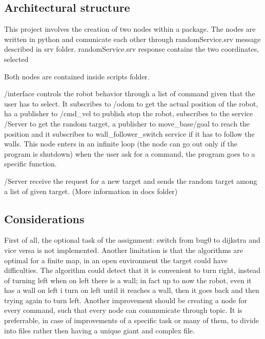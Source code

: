 \subsection*{Architectural structure}

This project involves the creation of two nodes within a package. The nodes are written in python and comunicate each other through \textquotesingle{}random\+Service.\+srv\textquotesingle{} message described in srv folder. \textquotesingle{}random\+Service.\+srv\textquotesingle{} response contains the two coordinates, selected

Both nodes are contained inside scripts folder.
\begin{DoxyItemize}
\item \textquotesingle{}/interface\textquotesingle{} controls the robot behavior through a list of command given that the user has to select. It subscribes to \textquotesingle{}/odom\textquotesingle{} to get the actual position of the robot, ha a publisher to \textquotesingle{}/cmd\+\_\+vel\textquotesingle{} to publish stop the robot, subscribes to the service \textquotesingle{}/\+Server\textquotesingle{} to get the random target, a publisher to \textquotesingle{}move\+\_\+base/goal\textquotesingle{} to reach the position and it subscribes to \textquotesingle{}wall\+\_\+follower\+\_\+switch\textquotesingle{} service if it has to follow the walls. This node enters in an infinite loop (the node can go out only if the program is shutdown) when the user ask for a command, the program goes to a specific function.
\item \textquotesingle{}/\+Server\textquotesingle{} receive the request for a new target and sends the random target among a list of given target. (More information in docs folder)
\end{DoxyItemize}

\subsection*{Considerations}

First of all, the optional task of the assignment\+: \textquotesingle{}switch from bug0 to dijkstra and vice versa\textquotesingle{} is not implemented. Another limitation is that the algorithms are optimal for a \textquotesingle{}finite\textquotesingle{} map, in an open environment the target could have difficulties. The algorithm could detect that it is convenient to turn right, instead of turning left when on left there is a wall; in fact up to now the robot, even it has a wall on left i turn on left until it reaches a wall, then it goes back and then trying again to turn left. Another improvement should be creating a node for every command, such that every node can communicate through topic. It is preferrable, in case of improvements of a specific task or many of them, to divide into files rather then having a unique giant and complex file. 